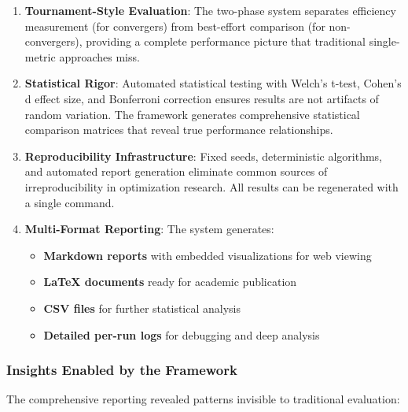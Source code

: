 \begin{enumerate}
\def\labelenumi{\arabic{enumi}.}
\item
  \textbf{Tournament-Style Evaluation}: The two-phase system separates efficiency measurement (for convergers) from best-effort comparison (for non-convergers), providing a complete performance picture that traditional single-metric approaches miss.
\item
  \textbf{Statistical Rigor}: Automated statistical testing with Welch's t-test, Cohen's d effect size, and Bonferroni correction ensures results are not artifacts of random variation. The framework generates comprehensive statistical comparison matrices that reveal true performance relationships.
\item
  \textbf{Reproducibility Infrastructure}: Fixed seeds, deterministic algorithms, and automated report generation eliminate common sources of irreproducibility in optimization research. All results can be regenerated with a single command.
\item
  \textbf{Multi-Format Reporting}: The system generates:

  \begin{itemize}
  \tightlist
  \item
    \textbf{Markdown reports} with embedded visualizations for web viewing
  \item
    \textbf{LaTeX documents} ready for academic publication
  \item
    \textbf{CSV files} for further statistical analysis
  \item
    \textbf{Detailed per-run logs} for debugging and deep analysis
  \end{itemize}
\end{enumerate}

\hypertarget{insights-enabled-by-the-framework}{%
\subsubsection{Insights Enabled by the Framework}\label{insights-enabled-by-the-framework}}

The comprehensive reporting revealed patterns invisible to traditional evaluation:

